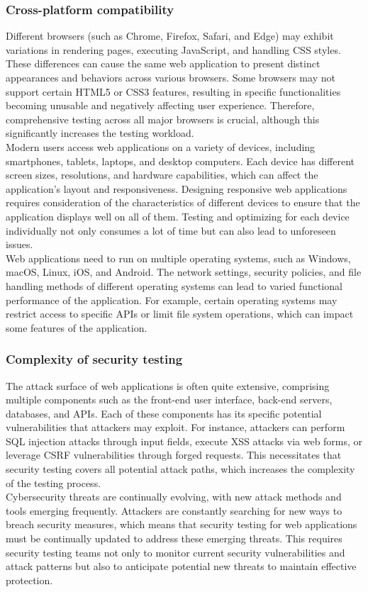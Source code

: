 \documentclass[a4paper, 11pt]{article}  %
\begin{document}
\subsubsection{Cross-platform compatibility}
\vspace{0.25cm} %
Different browsers (such as Chrome, Firefox, Safari, and Edge) may exhibit variations in rendering pages, executing JavaScript, and handling CSS styles. These differences can cause the same web application to present distinct appearances and behaviors across various browsers. Some browsers may not support certain HTML5 or CSS3 features, resulting in specific functionalities becoming unusable and negatively affecting user experience. Therefore, comprehensive testing across all major browsers is crucial, although this significantly increases the testing workload.\\
Modern users access web applications on a variety of devices, including smartphones, tablets, laptops, and desktop computers. Each device has different screen sizes, resolutions, and hardware capabilities, which can affect the application's layout and responsiveness. \cite{xanthopoulos2013comparative}Designing responsive web applications requires consideration of the characteristics of different devices to ensure that the application displays well on all of them. Testing and optimizing for each device individually not only consumes a lot of time but can also lead to unforeseen issues.\\
Web applications need to run on multiple operating systems, such as Windows, macOS, Linux, iOS, and Android. The network settings, security policies, and file handling methods of different operating systems can lead to varied functional performance of the application. For example, certain operating systems may restrict access to specific APIs or limit file system operations, which can impact some features of the application.
\subsubsection{Complexity of security testing}
\vspace{0.25cm} %
The attack surface of web applications is often quite extensive, comprising multiple components such as the front-end user interface, back-end servers, databases, and APIs. Each of these components has its specific potential vulnerabilities that attackers may exploit. For instance, attackers can perform SQL injection attacks through input fields, execute XSS attacks via web forms, or leverage CSRF vulnerabilities through forged requests.\cite{aydos2022security} This necessitates that security testing covers all potential attack paths, which increases the complexity of the testing process.\\
Cybersecurity threats are continually evolving, with new attack methods and tools emerging frequently. Attackers are constantly searching for new ways to breach security measures, which means that security testing for web applications must be continually updated to address these emerging threats. This requires security testing teams not only to monitor current security vulnerabilities and attack patterns but also to anticipate potential new threats to maintain effective protection.
\end{document}
